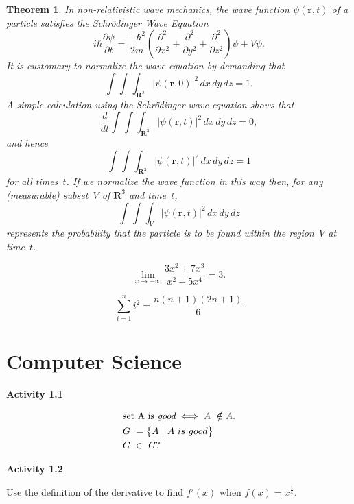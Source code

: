 \documentclass[10pt,a4paper]{report}
\theoremstyle{myn}
\newtheorem{theoremn}{Theorem}
\theoremstyle{myu}
\begin{document}
\begin{theoremn}
    
    In non-relativistic wave mechanics, the wave function
$\psi(\mathbf{r},t)$ of a particle satisfies the
\emph{Schr\"{o}dinger Wave Equation}
\[ i\hbar\frac{\partial \psi}{\partial t}
  = \frac{-\hbar^2}{2m} \left(
    \frac{\partial^2}{\partial x^2}
    + \frac{\partial^2}{\partial y^2}
    + \frac{\partial^2}{\partial z^2}
  \right) \psi + V \psi.\] 
It is customary to normalize the wave equation by
demanding that
\[ \int \!\!\! \int \!\!\! \int_{\textbf{R}^3}
      \left| \psi(\mathbf{r},0) \right|^2\,dx\,dy\,dz = 1.\] 
A simple calculation using the Schr\"{o}dinger wave
equation shows that
\[ \frac{d}{dt} \int \!\!\! \int \!\!\! \int_{\textbf{R}^3}
      \left| \psi(\mathbf{r},t) \right|^2\,dx\,dy\,dz = 0,\] 
and hence
\[ \int \!\!\! \int \!\!\! \int_{\textbf{R}^3}
      \left| \psi(\mathbf{r},t) \right|^2\,dx\,dy\,dz = 1\] 
for all times~$t$. If we normalize the wave function in this
way then, for any (measurable) subset~$V$ of $\textbf{R}^3$
and time~$t$,
\[ \int \!\!\! \int \!\!\! \int_V
      \left| \psi(\mathbf{r},t) \right|^2\,dx\,dy\,dz\] 
represents the probability that the particle is to be found
within the region~$V$ at time~$t$.
\end{theoremn}

\[ \lim_{x \to +\infty} \frac{3x^2 +7x^3}{x^2 +5x^4} = 3.\] 

$$\sum_{i=1}^n i^2 = \frac{n(n+1)(2n+1)}{6}$$

\clearpage


\section{Computer Science}


\center\textbf{Activity 1.1}

\begin{align*}
&\text{set A is}\ \textit{good} \iff A\  \notin  A.\\
&G\  = \left\{A\bigm|A \ is \ good\right\}\\
&G\  \in \ G?
\end{align*}

\center\textbf{Activity 1.2}

Use the definition of the derivative to find $f'(x)$ when $f(x)=x^{\frac{1}{4}}$.
\end{document}
